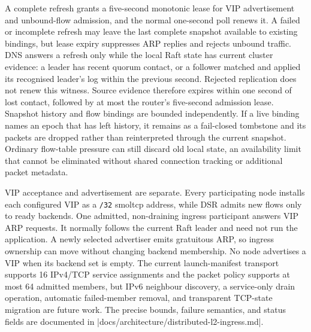 A complete refresh grants a five-second monotonic lease for VIP advertisement
and unbound-flow admission, and the normal one-second poll renews it. A failed or
incomplete refresh may leave the last complete snapshot available to existing
bindings, but lease expiry suppresses ARP replies and rejects unbound traffic.
DNS answers a refresh only while the local Raft state has current cluster
evidence: a leader has recent quorum contact, or a follower matched and applied
its recognised leader's log within the previous second. Rejected replication
does not renew this witness. Source evidence therefore expires within one
second of lost contact, followed by at most the router's five-second admission
lease.
Snapshot history and flow bindings are bounded independently. If a live
binding names an epoch that has left history, it remains as a fail-closed
tombstone and its packets are dropped rather than reinterpreted through the
current snapshot. Ordinary flow-table pressure can still discard old local
state, an availability limit that cannot be eliminated without shared
connection tracking or additional packet metadata.

VIP acceptance and advertisement are separate. Every participating node
installs each configured VIP as a \texttt{/32} smoltcp address, while DSR admits
new flows only to ready backends. One admitted, non-draining ingress participant
answers VIP ARP requests. It normally follows the current Raft leader and need
not run the application. A newly selected advertiser emits gratuitous ARP, so
ingress ownership can move without changing backend membership. No node
advertises a VIP when its backend set is empty. The current launch-manifest
transport supports 16 IPv4/TCP service assignments and the packet policy
supports at most 64 admitted members, but
IPv6 neighbour discovery, a service-only drain operation, automatic failed-member
removal, and transparent TCP-state migration are future work. The
precise bounds, failure semantics, and status fields are documented in
\repofile|docs/architecture/distributed-l2-ingress.md|.

